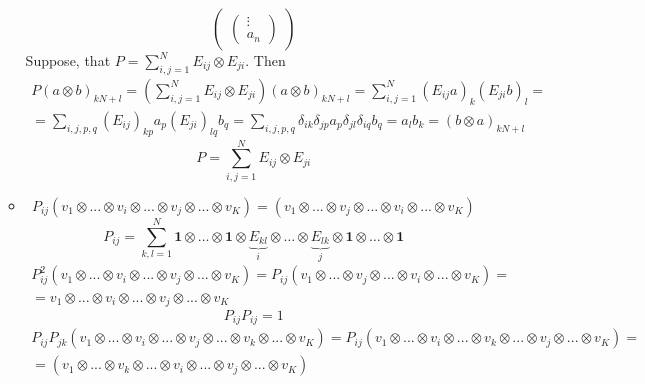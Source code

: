 \documentclass[12pt]{article}
\theoremstyle{definition}
\begin{document}
\begin{enumerate}
\begin{itemize}
\begin{equation}
\begin{pmatrix}
\begin{pmatrix}
                    \vdots\\
                    a_n
                \end{pmatrix}
            \end{pmatrix}
        \end{equation}
        Suppose, that $P=\sum\limits_{i,j=1}^{N}E_{ij}\otimes E_{ji}$. Then
        \begin{multline}
            P(a\otimes b)_{kN+l}=\left(\sum_{i,j=1}^NE_{ij} \otimes E_{ji}\right)(a\otimes b)_{kN+l}=\sum_{i,j=1}^N(E_{ij}a)_k(E_{ji}b)_l=\\=\sum\limits_{i,j,p,q}(E_{ij})_{kp}a_p(E_{ji})_{lq}b_q=\sum\limits_{i,j,p,q}\delta_{ik}\delta_{jp}a_p\delta_{jl}\delta_{iq}b_q=a_lb_k=(b\otimes a)_{kN+l}
        \end{multline}
        \begin{equation}
            \boxed{P=\sum\limits_{i,j=1}^{N}E_{ij}\otimes E_{ji}}
        \end{equation}
        \item
        \begin{equation}
            P_{ij} (v_1 \otimes ... \otimes v_i \otimes ...\otimes v_j \otimes ... \otimes v_K)=(v_1 \otimes ... \otimes v_j \otimes ... \otimes v_i \otimes ...\otimes v_K)
        \end{equation}
        \begin{equation}
            \boxed{P_{ij}=\sum_{k,l=1}^{N} \bm{1}\otimes \dots \otimes\bm{1} \otimes \underbrace{E_{kl}}_{i}\otimes \dots \otimes \underbrace{E_{lk}}_{j}\otimes \bm{1}\otimes \dots \otimes\bm{1}}
        \end{equation}
        \begin{multline}
            P^2_{ij}(v_1 \otimes ... \otimes v_i \otimes ...\otimes v_j \otimes ... \otimes v_K)=P_{ij}(v_1 \otimes ... \otimes v_j \otimes ... \otimes v_i \otimes ...\otimes v_K)=\\=v_1 \otimes ... \otimes v_i \otimes ...\otimes v_j \otimes ... \otimes v_K
        \end{multline}
        \begin{equation}
            \boxed{P_{ij}P_{ij}=1}
        \end{equation}
        \begin{multline}
            P_{ij}P_{jk}(v_1 \otimes ... \otimes v_i \otimes ... \otimes v_j \otimes ...\otimes v_k\otimes ... \otimes v_K)=P_{ij}(v_1 \otimes ... \otimes v_i \otimes ... \otimes v_k \otimes ...\otimes v_j\otimes ... \otimes v_K)=\\=(v_1 \otimes ... \otimes v_k \otimes ... \otimes v_i \otimes ...\otimes v_j\otimes ... \otimes v_K)

\end{multline}
\end{itemize}
\end{enumerate}
\end{document}
